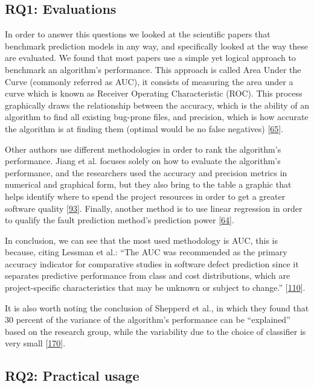 \documentclass[]{book}
\begin{document}
\subsection{RQ1: Evaluations}\label{rq1-evaluations}

In order to answer this questions we looked at the scientific papers
that benchmark prediction models in any way, and specifically looked at
the way these are evaluated. We found that most papers use a simple yet
logical approach to benchmark an algorithm's performance. This approach
is called Area Under the Curve (commonly referred as AUC), it consists
of measuring the area under a curve which is known as Receiver Operating
Characteristic (ROC). This process graphically draws the relationship
between the accuracy, which is the ability of an algorithm to find all
existing bug-prone files, and precision, which is how accurate the
algorithm is at finding them (optimal would be no false negatives)
{[}\protect\hyperlink{ref-DAmbros2012}{65}{]}.

Other authors use different methodologies in order to rank the
algorithm's performance. Jiang et al. focuses solely on how to evaluate
the algorithm's performance, and the researchers used the accuracy and
precision metrics in numerical and graphical form, but they also bring
to the table a graphic that helps identify where to spend the project
resources in order to get a greater software quality
{[}\protect\hyperlink{ref-Jiang2008}{93}{]}. Finally, another method is
to use linear regression in order to qualify the fault prediction
method's prediction power {[}\protect\hyperlink{ref-DAmbros2010}{64}{]}.

In conclusion, we can see that the most used methodology is AUC, this is
because, citing Lessman et al.: ``The AUC was recommended as the primary
accuracy indicator for comparative studies in software defect prediction
since it separates predictive performance from class and cost
distributions, which are project-specific characteristics that may be
unknown or subject to change.''
{[}\protect\hyperlink{ref-Lessman2008}{110}{]}.

It is also worth noting the conclusion of Shepperd et al., in which they
found that 30 percent of the variance of the algorithm's performance can
be ``explained'' based on the research group, while the variability due
to the choice of classifier is very small
{[}\protect\hyperlink{ref-Shepperd2014}{170}{]}.

\subsection{RQ2: Practical usage}\label{rq2-practical-usage}
\end{document}
